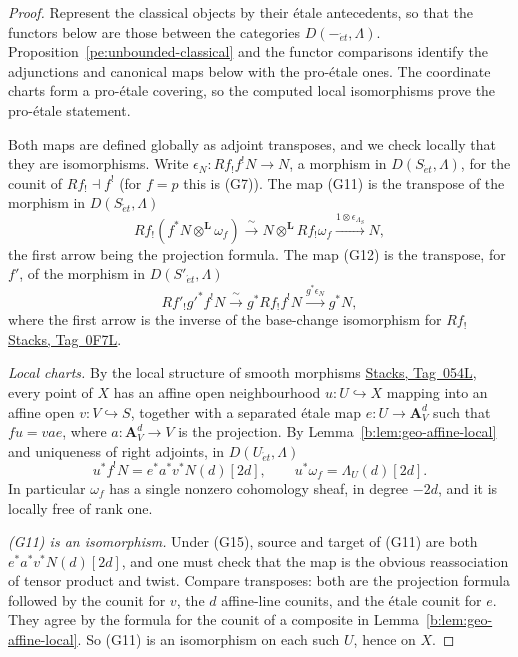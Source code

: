 \documentclass[11pt,a4paper]{article}
\numberwithin{equation}{section}
\theoremstyle{definition}
\theoremstyle{remark}
\newcommand{\et}{\acute{e}t}
\newcommand{\stacks}[1]{\href{https://stacks.math.columbia.edu/tag/#1}{\textnormal{Stacks, Tag~#1}}}
\begin{document}
\begin{proof}
Represent the classical objects by their \'etale antecedents, so that
the functors below are those between the categories
\(D(-_{\et},\Lambda)\).
Proposition~\ref{pe:unbounded-classical} and the functor comparisons
identify the adjunctions and canonical maps below with the pro-\'etale
ones. The coordinate
charts form a pro-\'etale covering, so the computed local
isomorphisms prove the pro-\'etale statement.

Both maps are defined globally as adjoint transposes, and we check
locally that they are isomorphisms. Write \(\epsilon_N:Rf_!f^!N\to N\),
a morphism in \(D(S_{\et},\Lambda)\), for the counit of
\(Rf_!\dashv f^!\) (for \(f=p\) this is (G7)). The map (G11) is the
transpose of the morphism in \(D(S_{\et},\Lambda)\)
\[
 Rf_!(f^*N\otimes^{\mathbf L}\omega_f)
    \xrightarrow{\ \sim\ }
 N\otimes^{\mathbf L}Rf_!\omega_f
    \xrightarrow{1\otimes\epsilon_{\Lambda_S}}N ,          \tag{G13}
\]
the first arrow being the projection formula. The map (G12) is the
transpose, for \(f'\), of the morphism in \(D(S'_{\et},\Lambda)\)
\[
 Rf'_!g'^*f^!N
   \xrightarrow{\ \sim\ }g^*Rf_!f^!N
   \xrightarrow{g^*\epsilon_N}g^*N,                       \tag{G14}
\]
where the first arrow is the inverse of the base-change isomorphism
for \(Rf_!\) \stacks{0F7L}.

\emph{Local charts.} By the local structure of smooth morphisms
\stacks{054L}, every point of \(X\) has an affine open neighbourhood
\(u:U\hookrightarrow X\) mapping into an affine open
\(v:V\hookrightarrow S\), together with a separated \'etale map
\(e:U\to\mathbf A^d_V\) such that \(fu=vae\), where
\(a:\mathbf A^d_V\to V\) is the projection. By
Lemma~\ref{b:lem:geo-affine-local} and uniqueness of right adjoints,
in \(D(U_{\et},\Lambda)\)
\[
 u^*f^!N=e^*a^*v^*N(d)[2d],\qquad
 u^*\omega_f=\Lambda_U(d)[2d].                            \tag{G15}
\]
In particular \(\omega_f\) has a single nonzero cohomology sheaf, in
degree \(-2d\), and it is locally free of rank one.

\emph{(G11) is an isomorphism.} Under (G15), source and target of (G11)
are both \(e^*a^*v^*N(d)[2d]\), and one must check that the map is the
obvious reassociation of tensor product and twist. Compare transposes:
both are the projection formula followed by the counit for \(v\), the
\(d\) affine-line counits, and the \'etale counit for \(e\). They agree
by the formula for the counit of a composite in
Lemma~\ref{b:lem:geo-affine-local}. So (G11) is an isomorphism on each
such \(U\), hence on \(X\).


\end{proof}
\end{document}
